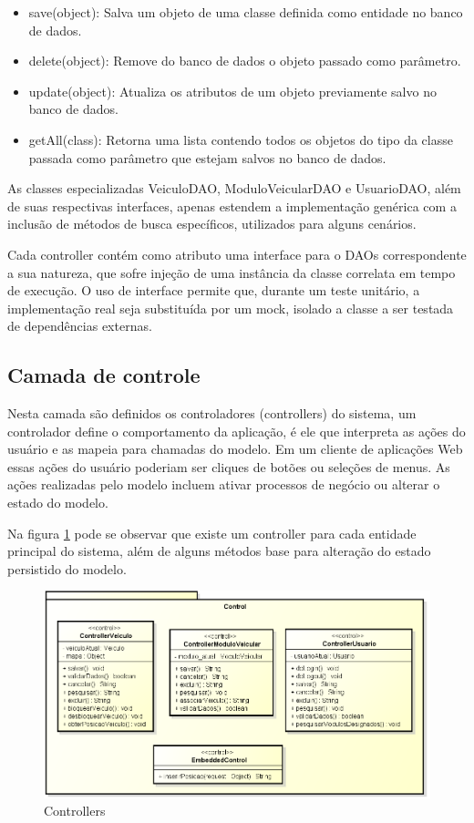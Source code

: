 \begin{itemize}
	\item save(object): Salva um objeto de uma classe definida como entidade no banco de dados.
	\item delete(object): Remove do banco de dados o objeto passado como parâmetro.
	\item update(object): Atualiza os atributos de um objeto previamente salvo no banco de dados.
	\item getAll(class): Retorna uma lista contendo todos os objetos do tipo da classe passada como parâmetro que estejam salvos no banco de dados.
\end{itemize}

As classes especializadas VeiculoDAO, ModuloVeicularDAO e UsuarioDAO, além de suas respectivas interfaces, apenas estendem a implementação genérica com a inclusão de métodos de busca específicos, utilizados para alguns cenários.

Cada controller contém como atributo uma interface para o DAOs correspondente a sua natureza, que sofre injeção de uma instância da classe correlata em tempo de execução. O uso de interface permite que, durante um teste unitário, a implementação real seja substituída por um mock, isolado a classe a ser testada de dependências externas.


\subsection{Camada de controle}

Nesta camada são definidos os controladores (controllers) do sistema, um controlador define o comportamento da aplicação, é ele que interpreta as ações do usuário e as mapeia para chamadas do modelo. Em um cliente de aplicações Web essas ações do usuário poderiam ser cliques de botões ou seleções de menus. As ações realizadas pelo modelo incluem ativar processos de negócio ou alterar o estado do modelo.

Na figura \ref{fig:webmancontrol} pode se observar que existe um controller para cada entidade principal do sistema, além de alguns métodos base para alteração do estado persistido do modelo.

\begin{figure}[!htb]
	\centering
	\includegraphics[width=\textwidth]{figures/webm_control.png}
	\caption{Controllers}
	\label{fig:webmancontrol}
\end{figure}

